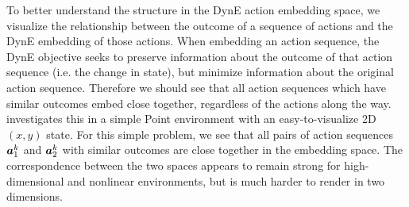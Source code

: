 \begin{subappendices}
\label{sec:latent-vis}


To better understand the structure in the DynE action embedding space, we visualize the relationship between the outcome of a sequence of actions and the DynE embedding of those actions.
When embedding an action sequence, the DynE objective seeks to preserve information about the outcome of that action sequence (i.e. the change in state), but minimize information about the original action sequence.
Therefore we should see that all action sequences which have similar outcomes embed close together, regardless of the actions along the way.
 investigates this in a simple Point environment with an easy-to-visualize 2D $(x, y)$ state.
For this simple problem, we see that all pairs of action sequences ${\bm{a}}^k_1$ and ${\bm{a}}^k_2$ with similar outcomes are close together in the embedding space.
The correspondence between the two spaces appears to remain strong for high-dimensional and nonlinear environments, but is much harder to render in two dimensions.


\end{subappendices}
